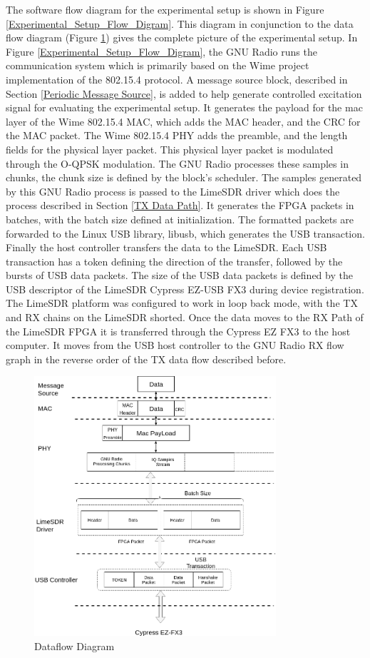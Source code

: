 The software flow diagram for the experimental setup is shown in Figure \ref{Experimental_Setup_Flow_Digram}.
This diagram in conjunction to the data flow diagram (Figure \ref{Dataflow}) gives the complete picture of the experimental setup.
In Figure \ref{Experimental_Setup_Flow_Digram}, the GNU Radio runs the communication system which is primarily based on the Wime project implementation of the 802.15.4 protocol.
A message source block, described in Section \ref{Periodic Message Source}, is added to help generate controlled excitation signal for evaluating the experimental setup.
It generates the payload for the \ac{mac} layer of the Wime 802.15.4 MAC, which adds the MAC header, and the \ac{CRC} for the MAC packet.
The Wime 802.15.4 PHY adds the preamble, and the length fields for the physical layer packet.
This physical layer packet is modulated through the O-QPSK modulation.
The GNU Radio processes these samples in chunks, the chunk size is defined by the block's scheduler.
The samples generated by this GNU Radio process is passed to the LimeSDR driver which does the process described in Section \ref{TX Data Path}.
It generates the FPGA packets in batches, with the batch size defined at initialization.
The formatted packets are forwarded to the Linux USB library, libusb, which generates the USB transaction.
Finally the host controller transfers the data to the LimeSDR.
Each USB transaction has a token defining the direction of the transfer, followed by the bursts of USB data packets.
The size of the USB data packets is defined by the USB descriptor of the LimeSDR Cypress EZ-USB FX3 during device registration.
The LimeSDR platform was configured to work in loop back mode, with the TX and RX chains on the LimeSDR shorted.
Once the data moves to the RX Path of the LimeSDR FPGA it is transferred through the Cypress EZ FX3 to the host computer.
It moves from the USB host controller to the GNU Radio RX flow graph in the reverse order of the TX data flow described before.


\begin{figure}[h!]
\centering
\includegraphics[width=0.8\textwidth]{Thesis/Figure/Dataflow.png}
\caption{Dataflow Diagram}
\label{Dataflow}
\end{figure}


